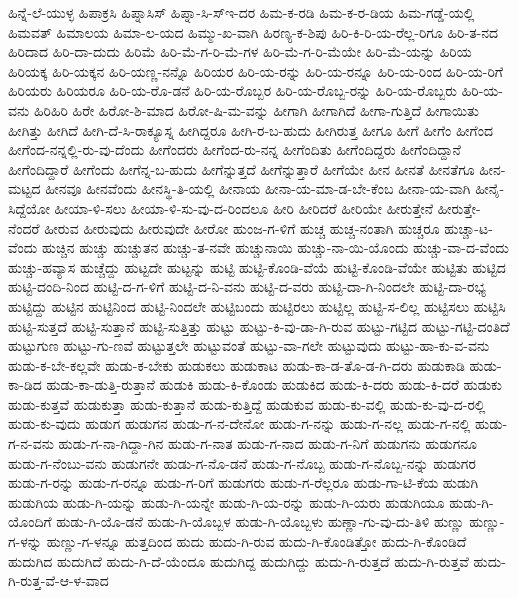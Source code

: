 {ಹಿನ್ನೆ-ಲೆ-ಯುಳ್ಳ
ಹಿಪಾಕ್ರಸಿ
ಹಿಪ್ನಾಸಿಸ್
ಹಿಪ್ನಾ-ಸಿ-ಸ್ಇ-ದರ
ಹಿಮ-ಕ-ರಡಿ
ಹಿಮ-ಕ-ರ-ಡಿಯ
ಹಿಮ-ಗಡ್ಡೆ-ಯಲ್ಲಿ
ಹಿಮವತ್
ಹಿಮಾಲಯ
ಹಿಮಾ-ಲ-ಯದ
ಹಿಮ್ಮು-ಖ-ವಾಗಿ
ಹಿರಣ್ಯ-ಕ-ಶಿಪು
ಹಿರಿ-ಕಿ-ರಿ-ಯ-ರೆಲ್ಲ-ರಿಗೂ
ಹಿರಿ-ತ-ನದ
ಹಿರಿದಾದ
ಹಿರಿ-ದಾ-ದುದು
ಹಿರಿಮೆ
ಹಿರಿ-ಮೆ-ಗ-ರಿ-ಮೆ-ಗಳ
ಹಿರಿ-ಮೆ-ಗ-ರಿ-ಮೆಯೇ
ಹಿರಿ-ಮೆ-ಯನ್ನು
ಹಿರಿಯ
ಹಿರಿಯಕ್ಕ
ಹಿರಿ-ಯಕ್ಕನ
ಹಿರಿ-ಯಣ್ಣ-ನನ್ನೊ
ಹಿರಿಯರ
ಹಿರಿ-ಯ-ರನ್ನು
ಹಿರಿ-ಯ-ರನ್ನೂ
ಹಿರಿ-ಯ-ರಿಂದ
ಹಿರಿ-ಯ-ರಿಗೆ
ಹಿರಿಯರು
ಹಿರಿಯರೂ
ಹಿರಿ-ಯ-ರೊ-ಡನೆ
ಹಿರಿ-ಯ-ರೊಬ್ಬರ
ಹಿರಿ-ಯ-ರೊಬ್ಬ-ರನ್ನು
ಹಿರಿ-ಯ-ರೊಬ್ಬರು
ಹಿರಿ-ಯ-ವನು
ಹಿರಿಹಿರಿ
ಹಿರೇ
ಹಿರೋ-ಶಿ-ಮಾದ
ಹಿರೋ-ಷಿ-ಮ-ವನ್ನು
ಹೀಗಾಗಿ
ಹೀಗಾಗಿದೆ
ಹೀಗಾ-ಗುತ್ತಿದೆ
ಹೀಗಾಯಿತು
ಹೀಗಿತ್ತು
ಹೀಗಿದೆ
ಹೀಗಿ-ದೆ-ಸಿ-ರಾಕ್ಯೂಸ್ನ
ಹೀಗಿದ್ದರೂ
ಹೀಗಿ-ರ-ಬ-ಹುದು
ಹೀಗಿರುತ್ತ
ಹೀಗೂ
ಹೀಗೆ
ಹೀಗೆಂ
ಹೀಗೆಂದ
ಹೀಗೆಂದ-ನನ್ನಲ್ಲಿ-ರು-ವು-ದೆಂದು
ಹೀಗೆಂದರು
ಹೀಗೆಂದ-ರು-ನನ್ನ
ಹೀಗೆಂದಿತು
ಹೀಗೆಂದಿದ್ದರು
ಹೀಗೆಂದಿದ್ದಾನೆ
ಹೀಗೆಂದಿದ್ದಾರೆ
ಹೀಗೆಂದು
ಹೀಗೆನ್ನ-ಬ-ಹುದು
ಹೀಗೆನ್ನುತ್ತದೆ
ಹೀಗೆನ್ನುತ್ತಾರೆ
ಹೀಗೆಯೇ
ಹೀನ
ಹೀನತೆ
ಹೀನತೆಗೂ
ಹೀನ-ಮಟ್ಟದ
ಹೀನವೂ
ಹೀನವೆಂದು
ಹೀನಸ್ಥಿ-ತಿ-ಯಲ್ಲಿ
ಹೀನಾಯ
ಹೀನಾ-ಯ-ಮಾ-ಡ-ಬೇ-ಕೆಂಬ
ಹೀನಾ-ಯ-ವಾಗಿ
ಹೀನೈ-ಸಿದ್ದೆಯೋ
ಹೀಯಾ-ಳಿ-ಸಲು
ಹೀಯಾ-ಳಿ-ಸು-ವು-ದ-ರಿಂದಲೂ
ಹೀರಿ
ಹೀರಿದರೆ
ಹೀರಿಯೇ
ಹೀರುತ್ತೇನೆ
ಹೀರುತ್ತೇ-ನೆಂದರೆ
ಹೀರುವ
ಹೀರುವುದು
ಹೀರುವುದೇ
ಹೀರೋ
ಹುಂಜ-ಗ-ಳಿಗೆ
ಹುಚ್ಚ
ಹುಚ್ಚ-ನಂತಾಗಿ
ಹುಚ್ಚರೂ
ಹುಚ್ಚಾ-ಟ-ವೆಂದು
ಹುಚ್ಚಿನ
ಹುಚ್ಚು
ಹುಚ್ಚುತನ
ಹುಚ್ಚು-ತ-ನವೇ
ಹುಚ್ಚುನಾಯಿ
ಹುಚ್ಚು-ನಾ-ಯಿ-ಯೊಂದು
ಹುಚ್ಚು-ವಾ-ದ-ವೆಂದು
ಹುಚ್ಚು-ಹವ್ಯಾಸ
ಹುಚ್ಚೆದ್ದು
ಹುಟ್ಟದೇ
ಹುಟ್ಟನ್ನು
ಹುಟ್ಟಿ
ಹುಟ್ಟಿ-ಕೊಂಡಿ-ವೆಯೆ
ಹುಟ್ಟಿ-ಕೊಂಡಿ-ವೆಯೇ
ಹುಟ್ಟಿತು
ಹುಟ್ಟಿದ
ಹುಟ್ಟಿ-ದಂದಿ-ನಿಂದ
ಹುಟ್ಟಿ-ದ-ಗ-ಳಿಗೆ
ಹುಟ್ಟಿ-ದ-ನಿ-ವನು
ಹುಟ್ಟಿ-ದ-ವರು
ಹುಟ್ಟಿ-ದಾ-ಗಿ-ನಿಂದಲೇ
ಹುಟ್ಟಿ-ದಾ-ರಭ್ಯ
ಹುಟ್ಟಿದ್ದು
ಹುಟ್ಟಿನ
ಹುಟ್ಟಿನಿಂದ
ಹುಟ್ಟಿ-ನಿಂದಲೇ
ಹುಟ್ಟಿಬಂದು
ಹುಟ್ಟಿರಲು
ಹುಟ್ಟಿಲ್ಲ
ಹುಟ್ಟಿ-ಸ-ಲಿಲ್ಲ
ಹುಟ್ಟಿಸಲು
ಹುಟ್ಟಿಸಿ
ಹುಟ್ಟಿ-ಸುತ್ತದೆ
ಹುಟ್ಟಿ-ಸುತ್ತಾನೆ
ಹುಟ್ಟಿ-ಸುತ್ತಿತ್ತು
ಹುಟ್ಟು
ಹುಟ್ಟು-ಕಿ-ವು-ಡಾ-ಗಿ-ರುವ
ಹುಟ್ಟು-ಗಟ್ಟಿದ
ಹುಟ್ಟು-ಗಟ್ಟಿ-ದಂತಿದೆ
ಹುಟ್ಟುಗುಣ
ಹುಟ್ಟು-ಗು-ಣವೆ
ಹುಟ್ಟುತ್ತಲೇ
ಹುಟ್ಟುವಂತೆ
ಹುಟ್ಟು-ವಾ-ಗಲೇ
ಹುಟ್ಟುವುದು
ಹುಟ್ಟು-ಹಾ-ಕು-ವ-ವನು
ಹುಡು-ಕ-ಬೇ-ಕಲ್ಲವೇ
ಹುಡು-ಕ-ಬೇಕು
ಹುಡುಕಲು
ಹುಡುಕಾಟ
ಹುಡು-ಕಾ-ಡ-ತೊ-ಡ-ಗಿ-ದರು
ಹುಡುಕಾಡಿ
ಹುಡು-ಕಾ-ಡಿದ
ಹುಡು-ಕಾ-ಡುತ್ತಿ-ರುತ್ತಾನೆ
ಹುಡುಕಿ
ಹುಡು-ಕಿ-ಕೊಂಡು
ಹುಡುಕಿದ
ಹುಡು-ಕಿ-ದರು
ಹುಡು-ಕಿ-ದರೆ
ಹುಡುಕು
ಹುಡು-ಕುತ್ತವೆ
ಹುಡುಕುತ್ತಾ
ಹುಡು-ಕುತ್ತಾನೆ
ಹುಡು-ಕುತ್ತಿದ್ದೆ
ಹುಡುಕುವ
ಹುಡು-ಕು-ವಲ್ಲಿ
ಹುಡು-ಕು-ವು-ದ-ರಲ್ಲಿ
ಹುಡು-ಕು-ವುದು
ಹುಡುಗ
ಹುಡುಗನ
ಹುಡು-ಗ-ನ-ದೇನೋ
ಹುಡು-ಗ-ನನ್ನು
ಹುಡು-ಗ-ನಲ್ಲ
ಹುಡು-ಗ-ನಲ್ಲಿ
ಹುಡು-ಗ-ನ-ವನು
ಹುಡು-ಗ-ನಾ-ಗಿದ್ದಾ-ಗಿನ
ಹುಡು-ಗ-ನಾತ
ಹುಡು-ಗ-ನಾದ
ಹುಡು-ಗ-ನಿಗೆ
ಹುಡುಗನು
ಹುಡುಗನೂ
ಹುಡು-ಗ-ನೆಂಬು-ವನು
ಹುಡುಗನೇ
ಹುಡು-ಗ-ನೊ-ಡನೆ
ಹುಡು-ಗ-ನೊಬ್ಬ
ಹುಡು-ಗ-ನೊಬ್ಬ-ನನ್ನು
ಹುಡುಗರ
ಹುಡು-ಗ-ರನ್ನು
ಹುಡು-ಗ-ರನ್ನೂ
ಹುಡು-ಗ-ರಿಗೆ
ಹುಡುಗರು
ಹುಡು-ಗ-ರೆಲ್ಲರೂ
ಹುಡು-ಗಾ-ಟಿ-ಕೆಯ
ಹುಡುಗಿ
ಹುಡುಗಿಯ
ಹುಡು-ಗಿ-ಯನ್ನು
ಹುಡು-ಗಿ-ಯನ್ನೇ
ಹುಡು-ಗಿ-ಯ-ರನ್ನು
ಹುಡು-ಗಿ-ಯರು
ಹುಡುಗಿಯೂ
ಹುಡು-ಗಿ-ಯೊಂದಿಗೆ
ಹುಡು-ಗಿ-ಯೊ-ಡನೆ
ಹುಡು-ಗಿ-ಯೊಬ್ಬಳ
ಹುಡು-ಗಿ-ಯೊಬ್ಬಳು
ಹುಣ್ಣಾ-ಗು-ವು-ದು-ತಿಳಿ
ಹುಣ್ಣು
ಹುಣ್ಣು-ಗ-ಳನ್ನು
ಹುಣ್ಣು-ಗ-ಳನ್ನೂ
ಹುತ್ತದಿಂದ
ಹುದು
ಹುದು-ಗಿ-ರುವ
ಹುದು-ಗಿ-ಕೊಂಡಿತ್ತೋ
ಹುದು-ಗಿ-ಕೊಂಡಿದೆ
ಹುದುಗಿದ
ಹುದುಗಿದೆ
ಹುದು-ಗಿ-ದೆ-ಯೆಂದೂ
ಹುದುಗಿದ್ದ
ಹುದುಗಿದ್ದು
ಹುದು-ಗಿ-ರುತ್ತದೆ
ಹುದು-ಗಿ-ರುತ್ತವೆ
ಹುದು-ಗಿ-ರುತ್ತ-ವೆ-ಆ-ಳ-ವಾದ
}
